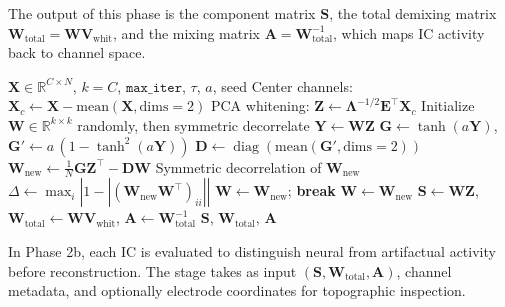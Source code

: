 The output of this phase is the component matrix $\mathbf{S}$, the total demixing matrix $\mathbf{W}_{\text{total}}=\mathbf{W}\mathbf{V}_{\text{whit}}$, and the mixing matrix $\mathbf{A}=\mathbf{W}_{\text{total}}^{-1}$, which maps IC activity back to channel space.

\begin{algorithm}[H]
\caption{Operational pseudocode for symmetric FastICA (Phase 2a)}
\begin{algorithmic}
\Require $\mathbf{X}\in\mathbb{R}^{C\times N}$, $k=C$, $\texttt{max\_iter}$, $\tau$, $a$, seed
\State Center channels: $\mathbf{X}_c \gets \mathbf{X}-\mathrm{mean}(\mathbf{X},\text{dims}=2)$
\State PCA whitening: $\mathbf{Z}\gets \mathbf{\Lambda}^{-1/2}\mathbf{E}^{\top}\mathbf{X}_c$
\State Initialize $\mathbf{W}\in\mathbb{R}^{k\times k}$ randomly, then symmetric decorrelate
  \State $\mathbf{Y}\gets \mathbf{W}\mathbf{Z}$
  \State $\mathbf{G}\gets \tanh(a\mathbf{Y})$, $\mathbf{G}'\gets a\,(1-\tanh^2(a\mathbf{Y}))$
  \State $\mathbf{D}\gets \operatorname{diag}(\mathrm{mean}(\mathbf{G}',\text{dims}=2))$
  \State $\mathbf{W}_{\text{new}}\gets \frac{1}{N}\mathbf{G}\mathbf{Z}^{\top}-\mathbf{D}\mathbf{W}$
  \State Symmetric decorrelation of $\mathbf{W}_{\text{new}}$
  \State $\Delta\gets \max_i\left|1-\left|\left(\mathbf{W}_{\text{new}}\mathbf{W}^{\top}\right)_{ii}\right|\right|$
  \If{$\Delta<\tau$}
    \State $\mathbf{W}\gets \mathbf{W}_{\text{new}}$; \textbf{break}
  \EndIf
  \State $\mathbf{W}\gets \mathbf{W}_{\text{new}}$
\EndFor
\State $\mathbf{S}\gets \mathbf{W}\mathbf{Z}$, $\mathbf{W}_{\text{total}}\gets \mathbf{W}\mathbf{V}_{\text{whit}}$, $\mathbf{A}\gets \mathbf{W}_{\text{total}}^{-1}$
\Ensure $\mathbf{S}$, $\mathbf{W}_{\text{total}}$, $\mathbf{A}$
\end{algorithmic}
\end{algorithm}

In Phase 2b, each IC is evaluated to distinguish neural from artifactual activity before reconstruction. The stage takes as input $(\mathbf{S},\mathbf{W}_{\text{total}},\mathbf{A})$, channel metadata, and optionally electrode coordinates for topographic inspection.

